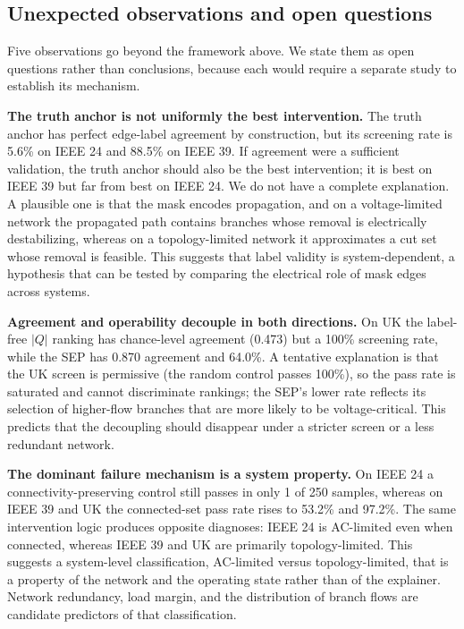 \subsection{Unexpected observations and open questions}\label{discussion_unexpected}

Five observations go beyond the framework above. We state them as open questions rather than conclusions, because each would require a separate study to establish its mechanism.

\textbf{The truth anchor is not uniformly the best intervention.} The truth anchor has perfect edge-label agreement by construction, but its screening rate is 5.6\% on IEEE 24 and 88.5\% on IEEE 39. If agreement were a sufficient validation, the truth anchor should also be the best intervention; it is best on IEEE 39 but far from best on IEEE 24. We do not have a complete explanation. A plausible one is that the mask encodes propagation, and on a voltage-limited network the propagated path contains branches whose removal is electrically destabilizing, whereas on a topology-limited network it approximates a cut set whose removal is feasible. This suggests that label validity is system-dependent, a hypothesis that can be tested by comparing the electrical role of mask edges across systems.

\textbf{Agreement and operability decouple in both directions.} On UK the label-free $|Q|$ ranking has chance-level agreement (0.473) but a 100\% screening rate, while the SEP has 0.870 agreement and 64.0\%. A tentative explanation is that the UK screen is permissive (the random control passes 100\%), so the pass rate is saturated and cannot discriminate rankings; the SEP's lower rate reflects its selection of higher-flow branches that are more likely to be voltage-critical. This predicts that the decoupling should disappear under a stricter screen or a less redundant network.

\textbf{The dominant failure mechanism is a system property.} On IEEE 24 a connectivity-preserving control still passes in only 1 of 250 samples, whereas on IEEE 39 and UK the connected-set pass rate rises to 53.2\% and 97.2\%. The same intervention logic produces opposite diagnoses: IEEE 24 is AC-limited even when connected, whereas IEEE 39 and UK are primarily topology-limited. This suggests a system-level classification, AC-limited versus topology-limited, that is a property of the network and the operating state rather than of the explainer. Network redundancy, load margin, and the distribution of branch flows are candidate predictors of that classification.

